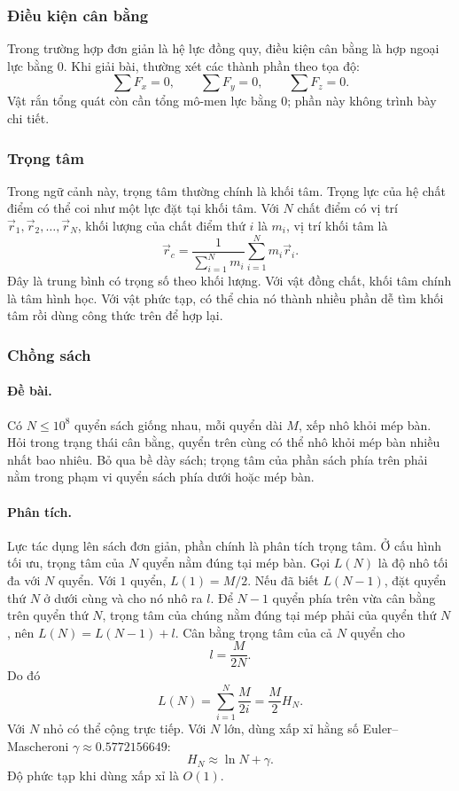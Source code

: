 \documentclass[11pt]{article}
\begin{document}
\subsubsection{Điều kiện cân bằng}

Trong trường hợp đơn giản là hệ lực đồng quy, điều kiện cân bằng là hợp ngoại
lực bằng \(0\). Khi giải bài, thường xét các thành phần theo tọa độ:
\[
  \sum F_x=0,\qquad \sum F_y=0,\qquad \sum F_z=0.
\]
Vật rắn tổng quát còn cần tổng mô-men lực bằng \(0\); phần này không trình bày
chi tiết.

\subsubsection{Trọng tâm}

Trong ngữ cảnh này, trọng tâm thường chính là khối tâm. Trọng lực của hệ chất
điểm có thể coi như một lực đặt tại khối tâm. Với \(N\) chất điểm có vị trí
\(\vec r_1,\vec r_2,\ldots,\vec r_N\), khối lượng của chất điểm thứ \(i\) là
\(m_i\), vị trí khối tâm là
\[
  \vec r_c=\frac{1}{\sum_{i=1}^N m_i}\sum_{i=1}^N m_i\vec r_i.
\]
Đây là trung bình có trọng số theo khối lượng. Với vật đồng chất, khối tâm
chính là tâm hình học. Với vật phức tạp, có thể chia nó thành nhiều phần dễ tìm
khối tâm rồi dùng công thức trên để hợp lại.

\subsubsection{Chồng sách}

\paragraph{Đề bài.}
Có \(N\le 10^8\) quyển sách giống nhau, mỗi quyển dài \(M\), xếp nhô khỏi mép
bàn. Hỏi trong trạng thái cân bằng, quyển trên cùng có thể nhô khỏi mép bàn
nhiều nhất bao nhiêu. Bỏ qua bề dày sách; trọng tâm của phần sách phía trên
phải nằm trong phạm vi quyển sách phía dưới hoặc mép bàn.

\paragraph{Phân tích.}
Lực tác dụng lên sách đơn giản, phần chính là phân tích trọng tâm. Ở cấu hình
tối ưu, trọng tâm của \(N\) quyển nằm đúng tại mép bàn. Gọi \(L(N)\) là độ nhô
tối đa với \(N\) quyển. Với \(1\) quyển, \(L(1)=M/2\). Nếu đã biết \(L(N-1)\),
đặt quyển thứ \(N\) ở dưới cùng và cho nó nhô ra \(l\). Để \(N-1\) quyển phía
trên vừa cân bằng trên quyển thứ \(N\), trọng tâm của chúng nằm đúng tại mép
phải của quyển thứ \(N\), nên \(L(N)=L(N-1)+l\). Cân bằng trọng tâm của cả
\(N\) quyển cho
\[
  l=\frac{M}{2N}.
\]
Do đó
\[
  L(N)=\sum_{i=1}^N\frac{M}{2i}=\frac{M}{2}H_N.
\]
Với \(N\) nhỏ có thể cộng trực tiếp. Với \(N\) lớn, dùng xấp xỉ hằng số
Euler--Mascheroni \(\gamma\approx 0.5772156649\):
\[
  H_N\approx \ln N+\gamma.
\]
Độ phức tạp khi dùng xấp xỉ là \(O(1)\).
\end{document}
